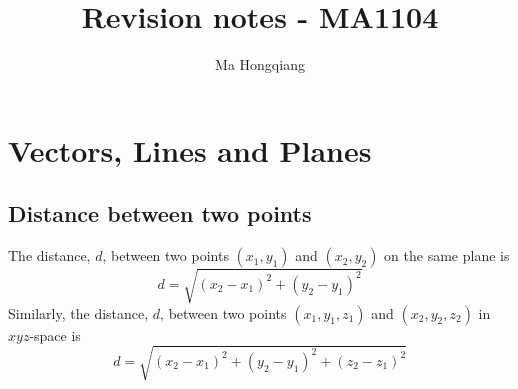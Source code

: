 \documentclass[12pt]{article}
\theoremstyle{definition}
\begin{document}
\title{Revision notes - MA1104}
\author{Ma Hongqiang}
\maketitle
\tableofcontents

\clearpage
\section{Vectors, Lines and Planes}
\subsection{Distance between two points}
The distance, $d$, between two points $(x_1, y_1)$ and $(x_2, y_2)$ on the same plane is 
\[
d = \sqrt{(x_2-x_1)^2+(y_2-y_1)^2}
\]
Similarly, the distance, $d$, between two points $(x_1,y_1,z_1)$ and $(x_2,y_2,z_2)$ in $xyz$-space is
\[
d = \sqrt{(x_2-x_1)^2 + (y_2-y_1)^2+(z_2-z_1)^2}
\]
\end{document}
